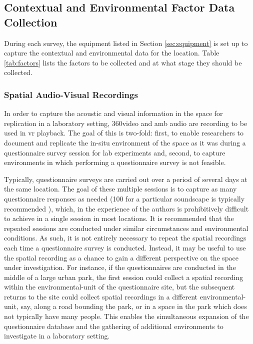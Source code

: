  \subsection{Contextual and Environmental Factor Data Collection}

   During each survey, the equipment listed in Section \ref{sec:equipment} is set up to capture the contextual and environmental data for the location. Table \ref{tab:factors} lists the factors to be collected and at what stage they should be collected.

   \subsubsection{Spatial Audio-Visual Recordings}

   In order to capture the acoustic and visual information in the space for replication in a laboratory setting, 360\degree video and \gls{amb} audio are recording to be used in \gls{vr} playback. The goal of this is two-fold: first, to enable researchers to document and replicate the in-situ environment of the space as it was during a questionnaire survey session for lab experiments and, second, to capture environments in which performing a questionnaire survey is not feasible.

   Typically, questionnaire surveys are carried out over a period of several days at the same location. The goal of these multiple sessions is to capture as many questionnaire responses as needed (100 for a particular soundscape is typically recommended ), which, in the experience of the authors %
   is prohibitively difficult to achieve in a single session in most locations. It is recommended that the repeated sessions are conducted under similar circumstances and environmental conditions. As such, it is not entirely necessary to repeat the spatial recordings each time a questionnaire survey is conducted. Instead, it may be useful to use the spatial recording as a chance to gain a different perspective on the space under investigation. For instance, if the questionnaires are conducted in the middle of a large urban park, the first session could collect a spatial recording within the \gls{environmental-unit} of the questionnaire site, but the subsequent returns to the site could collect spatial recordings in a different \gls{environmental-unit}, say, along a road bounding the park, or in a space in the park which does not typically have many people. This enables the simultaneous expansion of the questionnaire database and the gathering of additional environments to investigate in a laboratory setting.

